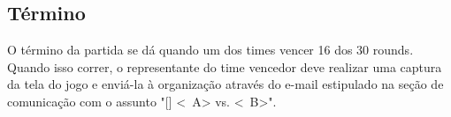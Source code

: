 \subsection{Término}

O término da partida se dá quando um dos times vencer 16 dos 30 rounds. Quando isso correr, o representante do time vencedor deve realizar uma captura da tela do jogo e enviá-la à organização através do e-mail estipulado na seção de comunicação com o assunto "[\Modality] <\BasicUnit\ A> vs. <\BasicUnit\ B>".